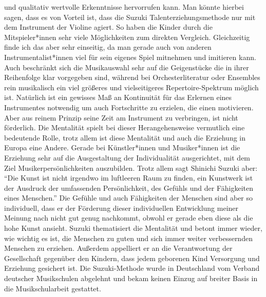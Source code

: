 und qualitativ wertvolle Erkenntnisse hervorrufen kann. Man könnte hierbei
sagen, dass es von Vorteil ist, dass die Suzuki Talenterziehungsmethode nur mit
dem Instrument der Violine agiert. So haben die Kinder durch die Mitspieler*innen
sehr viele Möglichkeiten zum direkten Vergleich. Gleichzeitig finde ich das aber
sehr einseitig, da man gerade auch von anderen Instrumentalist*innen viel für
sein eigenes Spiel mitnehmen und imitieren kann. Auch beschränkt sich die
Musikauswahl sehr auf die Geigenstücke die in ihrer Reihenfolge klar vorgegeben
sind, während bei Orchesterliteratur oder Ensembles rein musikalisch ein viel
größeres und vielseitigeres Repertoire-Spektrum möglich ist. Natürlich ist ein
gewisses Maß an Kontinuität für das Erlernen eines Instrumentes notwendig um
auch Fortschritte zu erzielen, die einen motivieren. Aber aus reinem Prinzip seine Zeit
am Instrument zu verbringen, ist nicht förderlich. Die Mentalität spielt
bei dieser Herangehensweise vermutlich eine bedeutende Rolle, trotz allem ist
diese Mentalität und auch die Erziehung in Europa eine Andere. Gerade bei
Künstler*innen und Musiker*innen ist die Erziehung sehr auf die Ausgestaltung
der Individualität ausgerichtet, mit dem Ziel Musikerpersönlichkeiten
auszubilden. Trotz allem sagt Shinichi Suzuki aber: \enquote{Die Kunst ist nicht
irgendwo im luftleeren Raum zu finden, ein Kunstwerk ist der Ausdruck der
umfassenden Persönlichkeit, des Gefühls und der Fähigkeiten eines Menschen.}
\autocite[103]{suzuki:erziehung_ist_liebe} Die Gefühle und auch Fähigkeiten der
Menschen sind aber so individuell, dass er der Förderung dieser individuellen
Entwicklung meiner Meinung nach nicht gut genug nachkommt, obwohl er gerade eben
diese als die hohe Kunst ansieht. Suzuki thematisiert die Mentalität und betont
immer wieder, wie wichtig es ist, die Menschen zu guten und sich immer weiter
verbessernden Menschen zu erziehen. Außerdem appelliert er an die Verantwortung
der Gesellschaft gegenüber den Kindern, dass jedem geborenen Kind Versorgung und
Erziehung gesichert ist. \autocite[130]{suzuki:erziehung_ist_liebe}
Die Suzuki-Methode wurde in Deutschland vom Verband deutscher Musikschulen
abgelehnt und bekam keinen Einzug auf breiter Basis in die Musikschularbeit gestattet.
\autocite[49]{ernst:die_zukunftsfaehige_musikschule}
